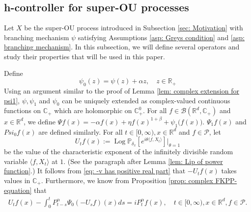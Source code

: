 \documentclass[12pt,a4paper]{amsart}
\theoremstyle{plain}
\theoremstyle{definition}
\numberwithin{equation}{section}
\begin{document}
\subsection{h-controller  for super-OU processes}
\label{sec: h-controller}
   Let $X$ be the super-OU process introduced in Subsection \ref{sec: Motivation}
    with branching mechanism $\psi$ satisfying
    Assumptions \ref{asp: Greys condition} and \ref{asp: branching mechanism}.
	In this subsection, we will define several operators and study their properties that will be used in this paper.

     Define
\begin{equation}
\label{eq: psi 0}
    \psi_0(z)=\psi(z)+\alpha z,\quad z\in \mathbb{R}_+
\end{equation}
  Using an argument similar to the proof  of Lemma \ref{lem: complex extension for psi1},
$\psi, \psi_1$ and $\psi_0$ 
    can be uniquely extended as complex-valued continuous functions on $\mathbb C_+$ which are holomorphic on $\mathbb C^0_+$.
    For all $f\in \mathcal B(\mathbb R^d, \mathbb C_+)$ and $x\in \mathbb R^d$, we define
$\Psi f (x) = -\alpha f(x) + \eta f(x)^{1+\beta} + \psi_1\big(f(x)\big)$. $\Psi_1 f(x)$ and
$Psi_0 f(x)$ are defined similarly.
    For all $t\in [0,\infty), x\in \mathbb R^d $ and $f \in \mathcal{P}$, let
\begin{equation}\label{eq: def of U_t}
    U_tf(x) := \operatorname{Log} \mathbb P_{\delta_x}[e^{i\theta \langle f, X_t\rangle}]|_{\theta = 1}
\end{equation}
    be the value of the characteristic exponent of the infinitely divisible random variable $\langle f, X_t\rangle$ at $1$.
    (See the paragraph after Lemma \ref{lem: Lip of power function}.)
    It follows from \eqref{eq: -v has positive real part} that $-U_tf(x)$ takes values in $\mathbb C_+$. Furthermore, we know from Proposition \ref{prop: complex FKPP-equation} that
\begin{align}
\label{eq:chareq2}
    U_tf(x)-\int_0^t P^\alpha_{t-s} \Psi_0(-U_sf)(x)ds
    =i P^{\alpha}_t f(x),
    \quad t\in [0,\infty), x\in \mathbb{R}^d, f\in \mathcal P.
\end{align}
\end{document}
